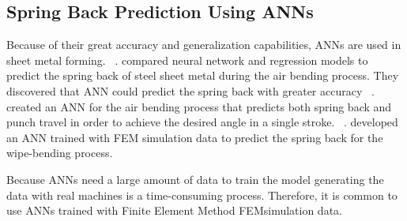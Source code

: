\subsection*{Spring Back Prediction Using ANNs}

Because of their great accuracy and generalization capabilities, \ac{ANN}s are used in sheet metal forming.
~\cite[p. 2]{cruz2021application}.
\cite{narayanasamy2012comparison} compared neural network and regression models to predict the
spring back of steel sheet metal during the air bending process.
They discovered that ANN could predict the spring back with greater accuracy
~\cite[]{narayanasamy2012comparison}.
\cite{inamdar2000development} created an ANN for the air bending process that
predicts both spring back and punch travel in
order to
achieve the desired angle in a single stroke.
~\cite{inamdar2000development}.
\cite{kazan2009prediction} developed an ANN trained with FEM simulation data to predict the
spring back for the wipe-bending process.

Because \ac{ANN}s need a large amount of data to train the model generating the data
with real machines is a time-consuming process.
Therefore, it is common to use \ac{ANN}s trained with Finite Element Method \ac{FEM}simulation data.